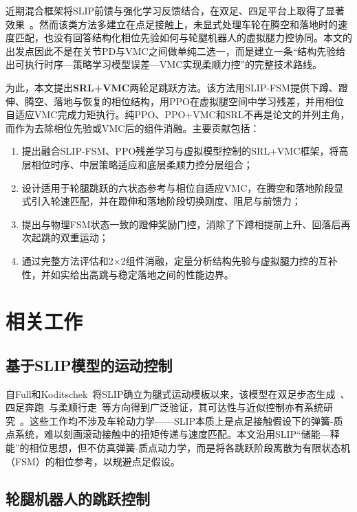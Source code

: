 \documentclass[12pt,a4paper,fontset=fandol]{ctexart}
\numberwithin{equation}{section}
\numberwithin{figure}{section}
\numberwithin{table}{section}
\begin{document}
近期混合框架将SLIP前馈与强化学习反馈结合，在双足、四足平台上取得了显著效果~\cite{hu2026srl}。然而该类方法多建立在点足接触上，未显式处理车轮在腾空和落地时的速度匹配，也没有回答结构化相位先验如何与轮腿机器人的虚拟腿力控协同。本文的出发点因此不是在关节PD与VMC之间做单纯二选一，而是建立一条“结构先验给出可执行时序—策略学习模型误差—VMC实现柔顺力控”的完整技术路线。

为此，本文提出\textbf{SRL+VMC}两轮足跳跃方法。该方法用SLIP-FSM提供下蹲、蹬伸、腾空、落地与恢复的相位结构，用PPO在虚拟腿空间中学习残差，并用相位自适应VMC完成力矩执行。纯PPO、PPO+VMC和SRL不再是论文的并列主角，而作为去除相位先验或VMC后的组件消融。主要贡献包括：
\begin{enumerate}[label=(\arabic*)]
    \item 提出融合SLIP-FSM、PPO残差学习与虚拟模型控制的SRL+VMC框架，将高层相位时序、中层策略适应和底层柔顺力控分层组合；
    \item 设计适用于轮腿跳跃的六状态参考与相位自适应VMC，在腾空和落地阶段显式引入轮速匹配，并在蹬伸和落地阶段切换刚度、阻尼与前馈力；
    \item 提出与物理FSM状态一致的蹬伸奖励门控，消除了下蹲相提前上升、回落后再次起跳的双重运动；
    \item 通过完整方法评估和2×2组件消融，定量分析结构先验与虚拟腿力控的互补性，并如实给出高跳与稳定落地之间的性能边界。
\end{enumerate}

\section{相关工作}

\subsection{基于SLIP模型的运动控制}

自Full和Koditschek~\cite{full1999templates}将SLIP确立为腿式运动模板以来，该模型在双足步态生成~\cite{geyer2019slip}、四足奔跑~\cite{he2024slip}与柔顺行走~\cite{xie2021vslip}等方向得到广泛验证，其可达性与近似控制亦有系统研究~\cite{piovan2015reachability, piovan2016approximation}。这些工作均不涉及车轮动力学——SLIP本质上是点足接触假设下的弹簧-质点系统，难以刻画滚动接触中的扭矩传递与速度匹配。本文沿用SLIP“储能—释能”的相位思想，但不仿真弹簧-质点动力学，而是将各跳跃阶段离散为有限状态机（FSM）的相位参考，以规避点足假设。

\subsection{轮腿机器人的跳跃控制}
\end{document}

